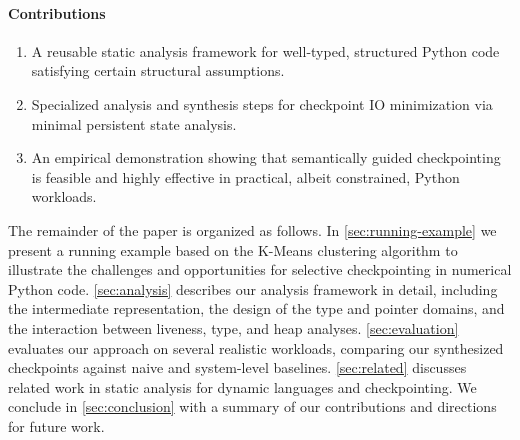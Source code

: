 \paragraph{Contributions}
\begin{enumerate}
\item A reusable static analysis framework for well-typed, structured Python code satisfying certain structural assumptions.
\item Specialized analysis and synthesis steps for checkpoint IO minimization via minimal persistent state analysis.
\item An empirical demonstration showing that semantically guided checkpointing is feasible and highly effective in practical, albeit constrained, Python workloads.
\end{enumerate}

The remainder of the paper is organized as follows. In \autoref{sec:running-example} we present a running example based on the K-Means clustering algorithm to illustrate the challenges and opportunities for selective checkpointing in numerical Python code. \autoref{sec:analysis} describes our analysis framework in detail, including the intermediate representation, the design of the type and pointer domains, and the interaction between liveness, type, and heap analyses. \autoref{sec:evaluation} evaluates our approach on several realistic workloads, comparing our synthesized checkpoints against naive and system-level baselines. \autoref{sec:related} discusses related work in static analysis for dynamic languages and checkpointing. We conclude in \autoref{sec:conclusion} with a summary of our contributions and directions for future work.
